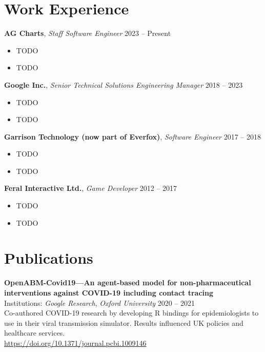 \documentclass[a4paper,10pt]{article}
\begin{document}
{\begin{minipage}[t]{0.72\textwidth}
    \section*{\color{navy} Work Experience}
    \textbf{AG Charts}, \textit{Staff Software Engineer} \hfill 2023 -- Present
    \begin{itemize}[leftmargin=1.5em, nosep]
        \item TODO
        \item TODO
    \end{itemize}
    \vspace{0.5em}
    \textbf{Google Inc.}, \textit{Senior Technical Solutions Engineering Manager} \hfill 2018 -- 2023
    \begin{itemize}[leftmargin=1.5em, nosep]
        \item TODO
        \item TODO
    \end{itemize}
    \vspace{0.5em}
    \textbf{Garrison Technology (now part of Everfox)}, \textit{Software Engineer} \hfill 2017 -- 2018
    \begin{itemize}[leftmargin=1.5em, nosep]
        \item TODO
        \item TODO
    \end{itemize}
    \vspace{0.5em}
    \textbf{Feral Interactive Ltd.}, \textit{Game Developer} \hfill 2012 -- 2017
    \begin{itemize}[leftmargin=1.5em, nosep]
        \item TODO
        \item TODO
    \end{itemize}
    \section*{\color{navy} Publications}
    \textbf{OpenABM-Covid19—An agent-based model for non-pharmaceutical interventions against COVID-19 including contact tracing}\\
    Institutions: \textit{Google Research}, \textit{Oxford University} \hfill 2020 -- 2021\\[1.0em]
    Co-authored COVID-19 research by developing R bindings for epidemiologists to use in their viral transmission simulator. Results influenced UK policies and healthcare services.\\
    \href{https://doi.org/10.1371/journal.pcbi.1009146}{https://doi.org/10.1371/journal.pcbi.1009146}
\end{minipage}%
\vfill %
}%
\end{document}
